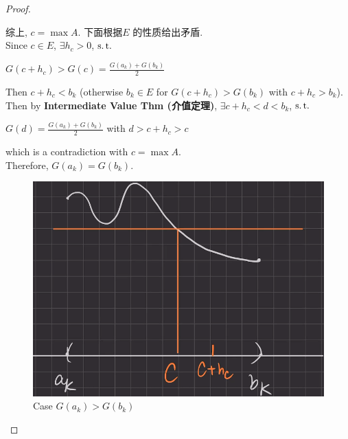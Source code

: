 \begin{lemma}
\begin{proof}
\begin{itemize}
\begin{itemize}
					\vspace{4em}
					
					综上, $c = \max{A}$. 下面根据$E$ 的性质给出矛盾. \\
					Since $c \in E$, $\exists h_c > 0$, $\operatorname{s.t.}$
					\begin{center}
						$G(c + h_c) > G(c) = \frac{G(a_k) + G(b_k)}{2}$
					\end{center}
					Then $c + h_c < b_k$ (otherwise $b_k \in E$ for $G(c + h_c) > G(b_k)$ with $c + h_c > b_k$). \\
					Then by \textbf{Intermediate Value Thm (介值定理)}, $\exists c + h_c < d < b_k$, $\operatorname{s.t.}$
					\begin{center}
						$G(d) = \frac{G(a_k) + G(b_k)}{2}$ with $d > c + h_c > c$
					\end{center}
					which is a contradiction with $c = \max{A}$. \\
					Therefore, $G(a_k) = G(b_k)$.
				\end{itemize}
				
				\begin{figure}[thbp!]
					\centering
					\includegraphics[width=0.5\linewidth]{figure/4.5.1-2}
					\caption{Case $G(a_k) > G(b_k)$}
					\label{pic : 4.5.1-2} %
				\end{figure}
			\end{itemize}
		\end{proof}
	\end{lemma}

